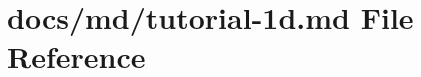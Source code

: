 \hypertarget{tutorial-1d_8md}{}\section{docs/md/tutorial-\/1d.md File Reference}
\label{tutorial-1d_8md}

